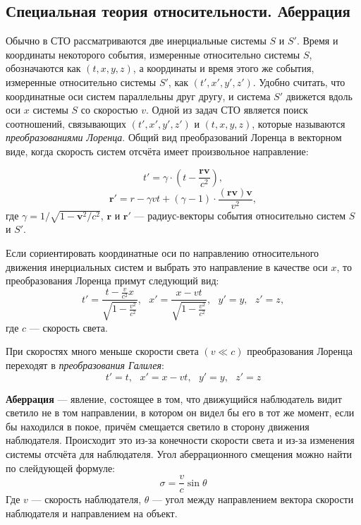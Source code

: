 \subsection{Специальная теория относительности. Аберрация}

Обычно в СТО рассматриваются две инерциальные системы $S$ и $S'$. Время и координаты некоторого события, измеренные относительно системы $S$, обозначаются как $(t, x, y, z)$, а координаты и время этого же события, измеренные относительно системы $S'$, как $(t', x', y', z')$. Удобно считать, что координатные оси систем параллельны друг другу, и система $S'$ движется вдоль оси $x$ системы $S$ со скоростью $v$. Одной из задач СТО является поиск соотношений, связывающих $(t', x', y', z')$ и $(t, x, y, z)$, которые называются \textit{преобразованиями Лоренца}. Общий вид преобразований Лоренца в векторном виде, когда скорость систем отсчёта имеет произвольное направление:

\begin{equation}
t'=\gamma\cdot \left(t-\frac{\mathbf{rv}}{c^2}\right),
\end{equation}
\begin{equation}
\mathbf{r'}=r-\gamma vt+(\gamma-1)\cdot\frac{(\mathbf{rv})\mathbf{v}}{v^2},
\end{equation}
где  $\gamma=1/{\sqrt {1-\mathbf {v} ^{2}/c^{2}}}$, $\mathbf{r}$ и $\mathbf{r'}$ --- радиус-векторы события относительно систем $S$ и $S'$.

Если сориентировать координатные оси по направлению относительного движения инерциальных систем и выбрать это направление в качестве оси $x$, то преобразования Лоренца примут следующий вид: 
\begin{equation}
t'=\frac{t-\frac{v}{c^2}x}{\sqrt{1-\frac{v^2}{c^2}}},\text{  } x'=\frac{x-vt}{\sqrt{1-\frac{v^2}{c^2}}},\text{  } y'=y,\text{  } z'=z,
\end{equation}
где $c$ --- скорость света.

 При скоростях много меньше скорости света $(v\ll c)$ преобразования Лоренца переходят в \textit{преобразования Галилея}:
\begin{equation}
 t'=t,\text{  } x'=x-vt,\text{  }  y'=y,\text{  }  z'=z
\end{equation}
 
\textbf{Аберрация} --- явление, состоящее в том, что движущийся наблюдатель видит светило не в том направлении, в котором он видел бы его в тот же момент, если бы находился в покое, причём смещается светило в сторону движения наблюдателя. Происходит это из-за конечности скорости света и из-за изменения системы отсчёта для наблюдателя.  
Угол аберрационного смещения можно найти по слейдующей формуле:
\begin{equation}\sigma=\frac{v}{c}\sin\theta
\end{equation}
Где $v$ --- скорость наблюдателя, $\theta$ --- угол между направлением вектора скорости наблюдателя и направлением на объект. 